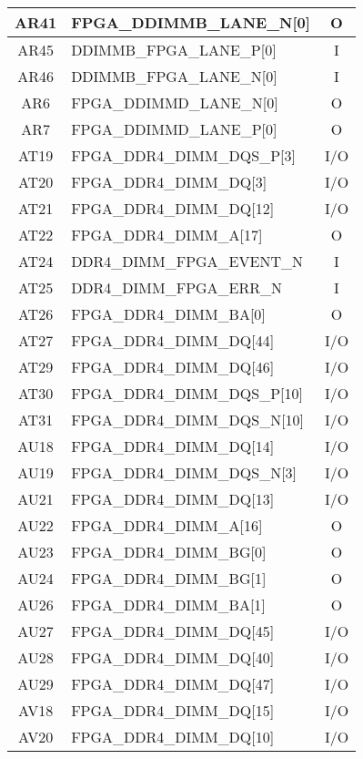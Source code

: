 \begin{longtable}[l]{| c | l | c |}
  AR41 & FPGA\_DDIMMB\_LANE\_N[0]     & O   \\ \hline
  AR45 & DDIMMB\_FPGA\_LANE\_P[0]     & I   \\ \hline
  AR46 & DDIMMB\_FPGA\_LANE\_N[0]     & I   \\ \hline
  AR6  & FPGA\_DDIMMD\_LANE\_N[0]     & O   \\ \hline
  AR7  & FPGA\_DDIMMD\_LANE\_P[0]     & O   \\ \hline
  AT19 & FPGA\_DDR4\_DIMM\_DQS\_P[3]  & I/O \\ \hline
  AT20 & FPGA\_DDR4\_DIMM\_DQ[3]      & I/O \\ \hline
  AT21 & FPGA\_DDR4\_DIMM\_DQ[12]     & I/O \\ \hline
  AT22 & FPGA\_DDR4\_DIMM\_A[17]      & O   \\ \hline
  AT24 & DDR4\_DIMM\_FPGA\_EVENT\_N   & I   \\ \hline
  AT25 & DDR4\_DIMM\_FPGA\_ERR\_N     & I   \\ \hline
  AT26 & FPGA\_DDR4\_DIMM\_BA[0]      & O   \\ \hline
  AT27 & FPGA\_DDR4\_DIMM\_DQ[44]     & I/O \\ \hline
  AT29 & FPGA\_DDR4\_DIMM\_DQ[46]     & I/O \\ \hline
  AT30 & FPGA\_DDR4\_DIMM\_DQS\_P[10] & I/O \\ \hline
  AT31 & FPGA\_DDR4\_DIMM\_DQS\_N[10] & I/O \\ \hline
  AU18 & FPGA\_DDR4\_DIMM\_DQ[14]     & I/O \\ \hline
  AU19 & FPGA\_DDR4\_DIMM\_DQS\_N[3]  & I/O \\ \hline
  AU21 & FPGA\_DDR4\_DIMM\_DQ[13]     & I/O \\ \hline
  AU22 & FPGA\_DDR4\_DIMM\_A[16]      & O   \\ \hline
  AU23 & FPGA\_DDR4\_DIMM\_BG[0]      & O   \\ \hline
  AU24 & FPGA\_DDR4\_DIMM\_BG[1]      & O   \\ \hline
  AU26 & FPGA\_DDR4\_DIMM\_BA[1]      & O   \\ \hline
  AU27 & FPGA\_DDR4\_DIMM\_DQ[45]     & I/O \\ \hline
  AU28 & FPGA\_DDR4\_DIMM\_DQ[40]     & I/O \\ \hline
  AU29 & FPGA\_DDR4\_DIMM\_DQ[47]     & I/O \\ \hline
  AV18 & FPGA\_DDR4\_DIMM\_DQ[15]     & I/O \\ \hline
  AV20 & FPGA\_DDR4\_DIMM\_DQ[10]     & I/O \\ \hline

\end{longtable}
